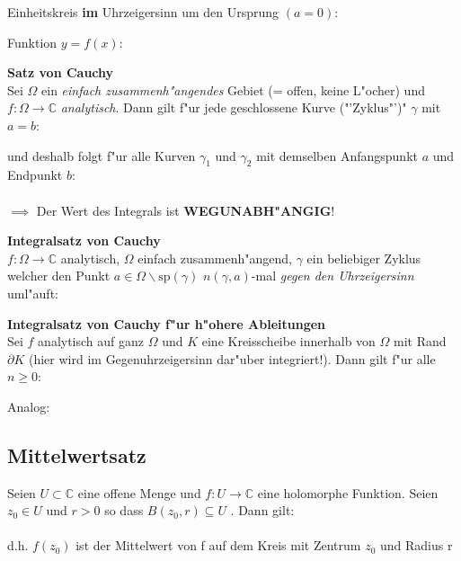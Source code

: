Einheitskreis \textbf{im} Uhrzeigersinn um den Ursprung \((a=0)\):\\

Funktion \(y=f(x)\):\\

\textbf{Satz von Cauchy}\\
Sei \(\Omega\) ein \emph{einfach zusammenh"angendes} Gebiet (= offen, keine L"ocher) und \(f: \Omega \to \mathbb{C}\)
\emph{analytisch}. Dann gilt f"ur jede geschlossene Kurve ("'Zyklus"')" \(\gamma\) mit \(a=b\):

und deshalb folgt f"ur alle Kurven \(\gamma_1\) und \(\gamma_2\) mit demselben Anfangspunkt \(a\) und Endpunkt \(b\):\\
\\
\(\implies\) Der Wert des Integrals ist \textbf{WEGUNABH"ANGIG}!


\textbf{Integralsatz von Cauchy}\\
\(f: \Omega \to \mathbb{C}\) analytisch, \(\Omega\) einfach zusammenh"angend, \(\gamma\) ein beliebiger Zyklus welcher
den Punkt \(a\in\Omega\backslash \text{sp}(\gamma)\) \(n(\gamma,a)\)-mal \emph{gegen den Uhrzeigersinn} uml"auft:\\

\textbf{Integralsatz von Cauchy f"ur h"ohere Ableitungen}\\
Sei \(f\) analytisch auf ganz \(\Omega\) und \(K\) eine Kreisscheibe innerhalb von \(\Omega\) mit Rand \(\partial K\) (hier wird
im Gegenuhrzeigersinn dar"uber integriert!).
Dann gilt f"ur alle \(n\geqslant 0\):\\

Analog:\\
\subsection{Mittelwertsatz}
Seien $ U ⊂ \mathbb{C}$ eine offene Menge und $f : U \rightarrow \mathbb{C}$ eine holomorphe Funktion. Seien $z_0 \in U$ und $r > 0$ so dass $B(z_0, r) \subseteq U$ . Dann gilt:\\
\\
d.h. $f(z_0)$ ist der Mittelwert von f auf dem Kreis mit Zentrum $z_0$ und Radius r


